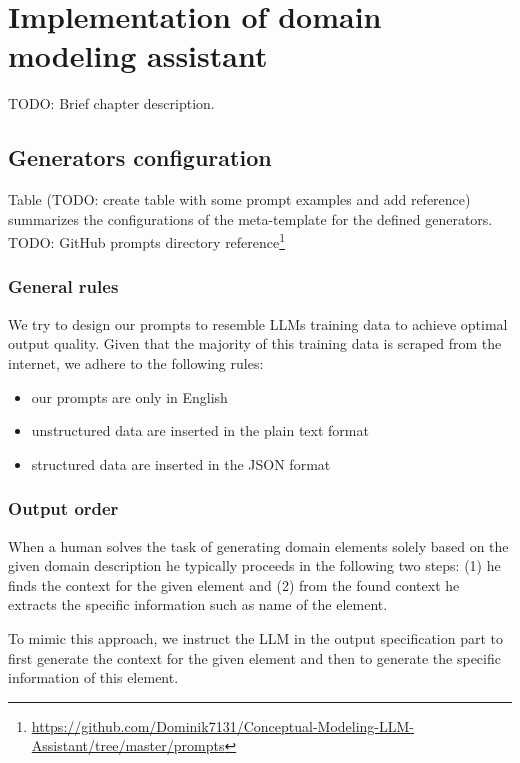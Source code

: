 \chapter{Implementation of domain modeling assistant}

TODO: Brief chapter description.


\section{Generators configuration}

Table (TODO: create table with some prompt examples and add reference) summarizes the configurations of the meta-template for the defined generators. \\

TODO: GitHub prompts directory reference\footnote{\url{https://github.com/Dominik7131/Conceptual-Modeling-LLM-Assistant/tree/master/prompts}}


\subsection{General rules}

We try to design our prompts to resemble LLMs training data to achieve optimal output quality. Given that the majority of this training data is scraped from the internet, we adhere to the following rules:
\begin{itemize}
\item our prompts are only in English
\item unstructured data are inserted in the plain text format
\item structured data are inserted in the JSON format
\end{itemize}


\subsection{Output order}
\label{output_order}
When a human solves the task of generating domain elements solely based on the given domain description he typically proceeds in the following two steps: (1) he finds the context for the given element and (2) from the found context he extracts the specific information such as name of the element.

To mimic this approach, we instruct the LLM in the output specification part to first generate the context for the given element and then to generate the specific information of this element.


